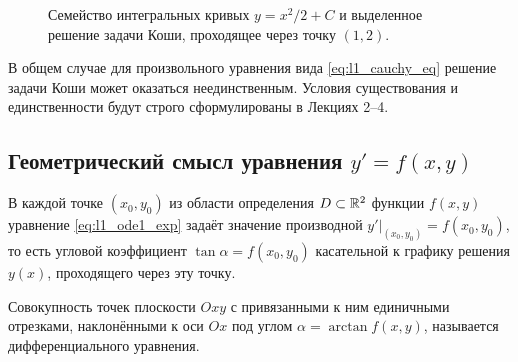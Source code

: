 \begin{figure}[H]
    \centering
    \caption{Семейство интегральных кривых $y = x^2/2 + C$ и выделенное
    решение задачи Коши, проходящее через точку $(1, 2)$.}
\end{figure}

\begin{remark}
    В общем случае для произвольного уравнения вида \eqref{eq:l1_cauchy_eq}
    решение задачи Коши может оказаться неединственным. Условия существования
    и единственности будут строго сформулированы в Лекциях 2–4.
\end{remark}

\subsection{Геометрический смысл уравнения $y' = f(x, y)$}

В каждой точке $(x_0, y_0)$ из области определения $D \subset \mathbb{R}^2$ функции
$f(x, y)$ уравнение \eqref{eq:l1_ode1_exp} задаёт значение производной
$\left. y' \right|_{(x_0, y_0)} = f(x_0, y_0)$, то есть угловой коэффициент
$\tan \alpha = f(x_0, y_0)$ касательной к графику решения $y(x)$, проходящего
через эту точку.

\begin{definition}
    Совокупность точек плоскости $Oxy$ с привязанными к ним единичными
    отрезками, наклонёнными к оси $Ox$ под углом $\alpha = \arctan f(x, y)$,
    называется  дифференциального уравнения.
\end{definition}

